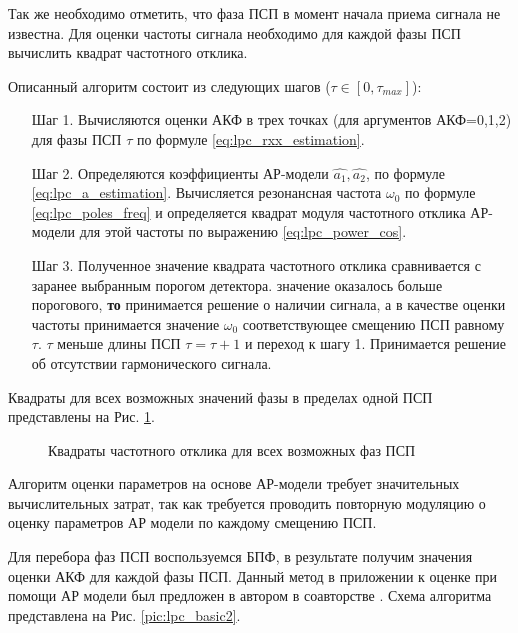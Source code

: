 Так же необходимо отметить, что фаза ПСП в момент начала приема сигнала не известна.
Для оценки частоты сигнала необходимо для каждой фазы ПСП вычислить квадрат частотного
отклика.

Описанный алгоритм состоит из следующих шагов (${\tau \in [0, \tau_{max}]}$):
\begin{itemize}[align=left,style=nextline,leftmargin=*,labelsep=\parindent,font=\normalfont]
\item[Шаг 1.] Вычисляются оценки АКФ в трех точках (для аргументов АКФ=0,1,2)
	для фазы ПСП ${\tau}$ по формуле \ref{eq:lpc_rxx_estimation}. 
\item[Шаг 2.] Определяются коэффициенты АР-модели ${\hat{a_1}, \hat{a_2}}$, 
	по формуле \ref{eq:lpc_a_estimation}. 
	Вычисляется резонансная частота ${\omega_0}$ по формуле \ref{eq:lpc_poles_freq}
	и определяется квадрат модуля частотного отклика АР-модели для этой частоты по выражению \ref{eq:lpc_power_cos}. 
\item[Шаг 3.] Полученное значение квадрата частотного отклика сравнивается с заранее выбранным порогом детектора. 
	  значение оказалось больше порогового, {\bf{то}} 
		принимается решение о наличии сигнала, а в качестве оценки
		частоты принимается значение ${\omega_0}$ соответствующее смещению ПСП равному ${\tau}$. 
	 ${\tau}$ меньше длины ПСП ${\tau = \tau + 1}$ и переход к шагу 1.
		Принимается решение об отсутствии гармонического сигнала.
\end{itemize}

Квадраты для всех возможных значений фазы в пределах одной ПСП представлены на Рис. \ref{pic:lpc_1sat_energy}.
\begin{figure}[h]
	\center{}
	\caption{Квадраты частотного отклика для всех возможных фаз ПСП}
	\label{pic:lpc_1sat_energy}
\end{figure}


Алгоритм оценки параметров на основе АР-модели требует значительных вычислительных затрат, так как требуется проводить
повторную модуляцию о оценку параметров АР модели по каждому смещению ПСП.

Для перебора фаз ПСП воспользуемся БПФ, в результате получим значения оценки АКФ для каждой фазы ПСП. Данный метод в приложении к оценке при помощи АР модели
был предложен в автором в соавторстве \cite{my_lpc_for_1, my_lpc_for_1_controllers}. Схема алгоритма представлена на Рис. \ref{pic:lpc_basic2}. 

